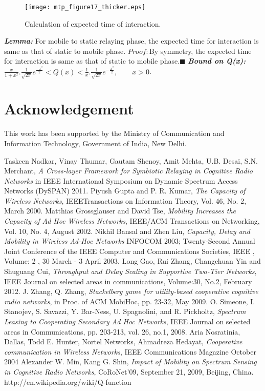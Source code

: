 \documentclass[conference]{IEEEtran}
\begin{document}
\begin{figure}[ht] \centering \label{con} \texttt{[image: mtp\_figure17\_thicker.eps]}\\
\caption{Calculation of expected time of interaction.} 
\vspace{0.05in}
\end{figure}
\emph{\bf Lemma:} For mobile to static relaying phase, the expected time for interaction is same as that of static to mobile phase.
$Proof: $By symmetry, the expected time for interaction is same as that of static to mobile phase.\quad\quad\quad\quad\quad\quad\quad\quad\quad$\blacksquare$
\emph{\bf Bound on Q(x):}\\$\frac{x}{1+x^2}.\frac{1}{\sqrt{2\pi}}e^\frac{-x^2}{2}<Q(x)<\frac{1}{x}.\frac{1}{\sqrt{2\pi}}e^{-\frac{x^2}{2}},\quad\quad x>0$\quad\quad[10].
\section{Acknowledgement}
This work has been supported by the Ministry of Communication and Information Technology, Government of India, New Delhi.
\begin{thebibliography}{1}
Taskeen Nadkar, Vinay Thumar, Gautam Shenoy, Amit Mehta, U.B. Desai, S.N. Merchant, \emph{A Cross-layer Framework for Symbiotic Relaying in 
Cognitive Radio Networks} in IEEE International Symposium on Dynamic Spectrum Access Networks (DySPAN) 2011.
Piyush Gupta and P. R. Kumar, \emph{The Capacity of Wireless Networks}, IEEETransactions on Information Theory, Vol. 46, No. 2, March 2000.
Matthias Grossglauser and David Tse, \emph{Mobility Increases the Capacity of Ad Hoc Wireless Networks}, IEEE/ACM Transactions on Networking, 
Vol. 10, No. 4, August 2002.
Nikhil Bansal and Zhen Liu, \emph{Capacity, Delay and Mobility in Wireless Ad-Hoc
Networks} INFOCOM 2003; Twenty-Second Annual Joint Conference of the IEEE
Computer and Communications Societies, IEEE , Volume: 2 , 30 March - 3 April 2003.
Long Gao, Rui Zhang, Changchuan Yin and Shuguang Cui, \emph{Throughput and Delay Scaling in Supportive Two-Tier Networks}, IEEE Journal on 
selected areas in communications, Volume:30, No.2, February 2012.
J. Zhang, Q. Zhang, \emph{Stackelberg game for utility-based cooperative cognitive radio networks}, in Proc. of ACM MobiHoc, pp. 23-32, May 2009.
O. Simeone, I. Stanojev, S. Savazzi, Y. Bar-Ness, U. Spagnolini, and R. Pickholtz, \emph{Spectrum Leasing to Cooperating Secondary Ad Hoc Networks}, 
IEEE Journal on selected areas in Communications, pp. 203-213, vol. 26, no.1, 2008.
Aria Nosratinia, Dallas, Todd E. Hunter, Nortel Networks, Ahmadreza Hedayat, \emph{Cooperative communication in Wireless Networks}, 
IEEE Communications Magazine October 2004
Alexander W. Min, Kang G. Shin, \emph{Impact of Mobility on Spectrum Sensing in Cognitive Radio Networks}, CoRoNet'09, September 21, 2009, Beijing, China. 
http://en.wikipedia.org/wiki/Q-function
\end{thebibliography}
\end{document}
